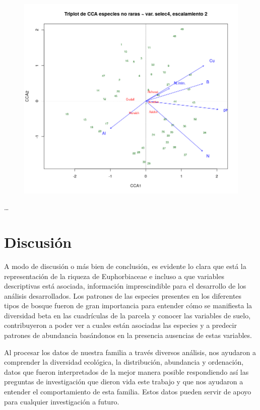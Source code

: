 \documentclass[11pt,]{article}
\begin{document}
\begin{figure}
\centering
\includegraphics{no_raras.png}
\caption{\label{fig:no_raras}}
\end{figure}

\ldots

\section{Discusión}\label{discusiuxf3n}

A modo de discusión o más bien de conclusión, es evidente lo clara que
está la representación de la riqueza de Euphorbiaceae e incluso a que
variables descriptivas está asociada, información imprescindible para el
desarrollo de los análisis desarrollados. Los patrones de las especies
presentes en los diferentes tipos de bosque fueron de gran importancia
para entender cómo se manifiesta la diversidad beta en las cuadrículas
de la parcela y conocer las variables de suelo, contribuyeron a poder
ver a cuales están asociadas las especies y a predecir patrones de
abundancia basándonos en la presencia ausencias de estas variables.

Al procesar los datos de nuestra familia a través diversos análisis, nos
ayudaron a comprender la diversidad ecológica, la distribución,
abundancia y ordenación, datos que fueron interpretados de la mejor
manera posible respondiendo así las preguntas de investigación que
dieron vida este trabajo y que nos ayudaron a entender el comportamiento
de esta familia. Estos datos pueden servir de apoyo para cualquier
investigación a futuro.
\end{document}
